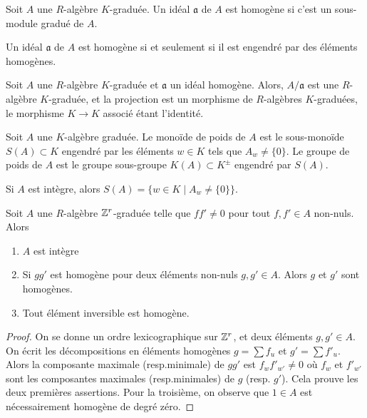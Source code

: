 \begin{defn}
Soit $A$ une $R$-algèbre $K$-graduée. Un idéal $\mathfrak{a}$ de $A$ est homogène si c'est un sous-module gradué de $A$.
\end{defn}

\begin{prop}
Un idéal $\mathfrak{a}$ de $A$ est homogène si et seulement si il est engendré par des éléments homogènes.
\end{prop}

\begin{rem}
Soit $A$ une $R$-algèbre $K$-graduée et $\mathfrak{a}$ un idéal homogène. Alors, $A/\mathfrak{a}$ est une $R$-algèbre $K$-graduée, et la projection est un morphisme de $R$-algèbres $K$-graduées, le morphisme $K\rightarrow K$ associé étant l'identité.
\end{rem}

\begin{defn}
Soit $A$ une $K$-algèbre graduée. Le monoïde de poids de $A$ est le sous-monoïde $S(A)\subset K$ engendré par les éléments $w\in K$ tels que $A_w\neq \lbrace 0 \rbrace$. Le groupe de poids de $A$ est le groupe sous-groupe $K(A)\subset K^{\pm}$ engendré par $S(A)$.
\end{defn}

\begin{rem}
Si $A$ est intègre, alors $S(A)=\lbrace w\in K\mid A_w\neq \lbrace 0\rbrace\rbrace$.
\end{rem}

\begin{prop}
Soit $A$ une $R$-algèbre $\mathbb{Z}^r$-graduée telle que $ff'\neq 0$ pour tout $f,f'\in A$ non-nuls. Alors
\begin{enumerate}
\item $A$ est intègre
\item Si $gg'$ est homogène pour deux éléments non-nuls $g,g'\in A$. Alors $g$ et $g'$ sont homogènes.
\item Tout élément inversible est homogène.
\end{enumerate}
\end{prop}
\begin{proof}
On se donne un ordre lexicographique sur $\mathbb{Z}^r$, et deux éléments $g,g'\in A$. On écrit les décompositions en éléments homogènes $g=\sum f_u$ et $g'=\sum f'_u$. Alors la composante maximale (resp.minimale) de $gg'$ est $f_wf'_{w'}\neq 0$ où $f_w$ et $f'_{w'}$ sont les composantes maximales (resp.minimales) de $g$ (resp. $g'$). Cela prouve les deux premières assertions. Pour la troisième, on observe que $1\in A$ est nécessairement homogène de degré zéro.
\end{proof}



